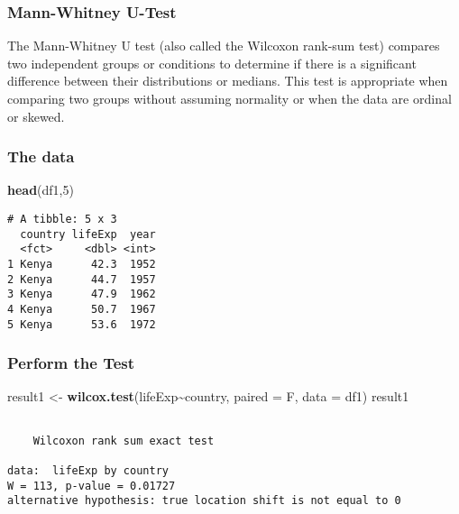 \documentclass[
]{article}
\newenvironment{Shaded}{\begin{snugshade}}{\end{snugshade}}
\newcommand{\AttributeTok}[1]{\textcolor[rgb]{0.13,0.29,0.53}{#1}}
\newcommand{\DecValTok}[1]{\textcolor[rgb]{0.00,0.00,0.81}{#1}}
\newcommand{\FunctionTok}[1]{\textcolor[rgb]{0.13,0.29,0.53}{\textbf{#1}}}
\newcommand{\NormalTok}[1]{#1}
\newcommand{\OtherTok}[1]{\textcolor[rgb]{0.56,0.35,0.01}{#1}}
\newcommand{\SpecialCharTok}[1]{\textcolor[rgb]{0.81,0.36,0.00}{\textbf{#1}}}
\begin{document}
\hypertarget{mann-whitney-u-test}{%
\subsubsection{Mann-Whitney U-Test}\label{mann-whitney-u-test}}

The Mann-Whitney U test (also called the Wilcoxon rank-sum test)
compares two independent groups or conditions to determine if there is a
significant difference between their distributions or medians. This test
is appropriate when comparing two groups without assuming normality or
when the data are ordinal or skewed.

\hypertarget{the-data}{%
\subsubsection{The data}\label{the-data}}

\begin{Shaded}
\begin{Highlighting}[]
\FunctionTok{head}\NormalTok{(df1,}\DecValTok{5}\NormalTok{)}
\end{Highlighting}
\end{Shaded}

\begin{verbatim}
# A tibble: 5 x 3
  country lifeExp  year
  <fct>     <dbl> <int>
1 Kenya      42.3  1952
2 Kenya      44.7  1957
3 Kenya      47.9  1962
4 Kenya      50.7  1967
5 Kenya      53.6  1972
\end{verbatim}

\hypertarget{perform-the-test-3}{%
\subsubsection{Perform the Test}\label{perform-the-test-3}}

\begin{Shaded}
\begin{Highlighting}[]
\NormalTok{result1 }\OtherTok{\textless{}{-}} \FunctionTok{wilcox.test}\NormalTok{(lifeExp}\SpecialCharTok{\textasciitilde{}}\NormalTok{country, }\AttributeTok{paired =}\NormalTok{ F, }\AttributeTok{data =}\NormalTok{ df1)}
\NormalTok{result1}
\end{Highlighting}
\end{Shaded}

\begin{verbatim}

    Wilcoxon rank sum exact test

data:  lifeExp by country
W = 113, p-value = 0.01727
alternative hypothesis: true location shift is not equal to 0
\end{verbatim}
\end{document}
